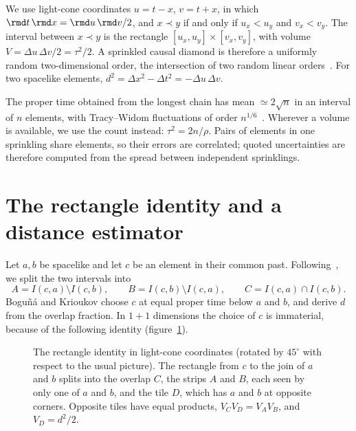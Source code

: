 \documentclass[12pt]{iopart}
\begin{document}
We use light-cone coordinates $u=t-x$, $v=t+x$, in which $\rmd t\,\rmd x=\rmd u\,\rmd v/2$, and $x\prec y$ if and only if $u_x<u_y$ and $v_x<v_y$. The interval between $x\prec y$ is the rectangle $[u_x,u_y]\times[v_x,v_y]$, with volume $V=\Delta u\,\Delta v/2=\tau^2/2$. A sprinkled causal diamond is therefore a uniformly random two-dimensional order, the intersection of two random linear orders~\cite{BHS08,Surya12}. For two spacelike elements, $d^2=\Delta x^2-\Delta t^2=-\Delta u\,\Delta v$.

The proper time obtained from the longest chain has mean $\simeq2\sqrt n$ in an interval of $n$ elements, with Tracy--Widom fluctuations of order $n^{1/6}$~\cite{BDJ99}. Wherever a volume is available, we use the count instead: $\tau^2=2n/\rho$. Pairs of elements in one sprinkling share elements, so their errors are correlated; quoted uncertainties are therefore computed from the spread between independent sprinklings.

\section{The rectangle identity and a distance estimator}\label{sec:dist}
Let $a,b$ be spacelike and let $c$ be an element in their common past. Following~\cite{BK24}, we split the two intervals into
\begin{equation}
A=I(c,a)\setminus I(c,b),\qquad B=I(c,b)\setminus I(c,a),\qquad
C=I(c,a)\cap I(c,b).
\end{equation}
Bogu\~n\'a and Krioukov choose $c$ at equal proper time below $a$ and $b$, and derive $d$ from the overlap fraction. In $1+1$ dimensions the choice of $c$ is immaterial, because of the following identity (figure~\ref{fig:tiles}).

\begin{figure}[t]
\centering
{}
\caption{The rectangle identity in light-cone coordinates (rotated by $45^\circ$ with respect to the usual picture). The rectangle from $c$ to the join of $a$ and $b$ splits into the overlap $C$, the strips $A$ and $B$, each seen by only one of $a$ and $b$, and the tile $D$, which has $a$ and $b$ at opposite corners. Opposite tiles have equal products, $V_CV_D=V_AV_B$, and $V_D=d^2/2$.}
\label{fig:tiles}
\end{figure}
\end{document}
